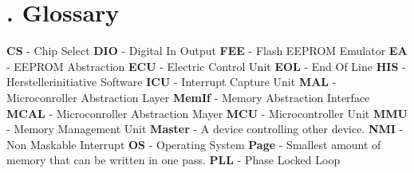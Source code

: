 \chapter[Glossary]{\thechapter. Glossary}

{\bf CS} - Chip Select\newline
\newline
{\bf DIO} - Digital In Output\newline
\newline
{\bf FEE} - Flash EEPROM Emulator\newline
\newline
{\bf EA} - EEPROM Abstraction\newline
\newline
{\bf ECU} - Electric Control Unit\newline
\newline 
{\bf EOL} - End Of Line\newline
\newline
{\bf HIS} - Herstellerinitiative Software\newline
\newline
{\bf ICU} - Interrupt Capture Unit\newline
\newline
{\bf MAL} - Microconroller Abstraction Layer\newline
\newline
{\bf MemIf} - Memory Abstraction Interface\newline
\newline	
{\bf MCAL} - Microconroller Abstraction Mayer\newline
\newline
{\bf MCU} - Microcontroller Unit\newline
\newline
{\bf MMU} - Memory Management Unit\newline
\newline
{\bf Master} - A device controlling other device.\newline
\newline
{\bf NMI} - Non Maskable Interrupt\newline
\newline
{\bf OS} - Operating System\newline
\newline
{\bf Page} - Smallest amount of memory that can be written in one pass.\newline
\newline
{\bf PLL} - Phase Locked Loop\newline
